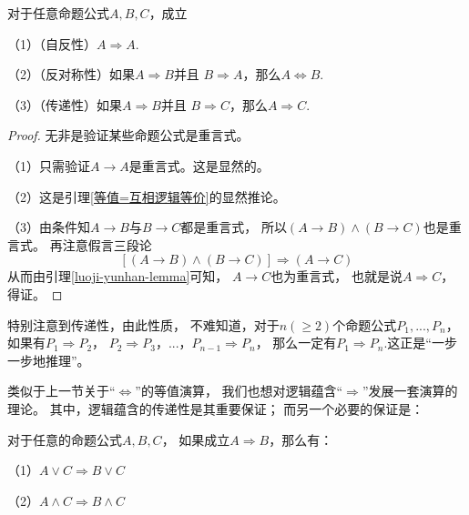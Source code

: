 \begin{thm}[逻辑蕴含是偏序关系]
对于任意命题公式$A,B,C$，成立

（1）（自反性）$A\Rightarrow A$.

（2）（反对称性）如果$A\Rightarrow B$并且
$B\Rightarrow A$，那么$A\Leftrightarrow B$.

（3）（传递性）如果$A\Rightarrow B$并且
$B\Rightarrow C$，那么$A\Rightarrow C$.
\label{logic imply-partial order}
\end{thm}

\begin{proof}无非是验证某些命题公式是重言式。

（1）只需验证$A\rightarrow A$是重言式。这是显然的。

（2）这是引理\ref{等值=互相逻辑等价}的显然推论。

（3）由条件知$A\rightarrow B$与$B\rightarrow C$都是重言式，
所以$(A\rightarrow B)\wedge(B\rightarrow C)$也是重言式。
再注意假言三段论
$$[(A\rightarrow B)\wedge(B\rightarrow C)]
\Rightarrow(A\rightarrow C)$$
从而由引理\ref{luoji-yunhan-lemma}可知，
$A\rightarrow C$也为重言式，
也就是说$A\Rightarrow C$，得证。
\end{proof}

特别注意到传递性，由此性质，
不难知道，对于$n(\geq 2)$个命题公式$P_1,...,P_n$，
如果有$P_1\Rightarrow P_2$，
$P_2\Rightarrow P_3$，...，$P_{n-1}\Rightarrow P_n$，
那么一定有$P_1\Rightarrow P_n$.这正是“一步一步地推理”。\vs

类似于上一节关于“$\Leftrightarrow$”的等值演算，
我们也想对逻辑蕴含“$\Rightarrow$”发展一套演算的理论。
其中，逻辑蕴含的传递性是其重要保证；
而另一个必要的保证是：

\begin{thm}[逻辑蕴含的置换规则]
\label{逻辑蕴含的置换规则}
对于任意的命题公式$A,B,C$，
如果成立$A\Rightarrow B$，那么有：

（1）$A\vee C\Rightarrow B\vee C$

（2）$A\wedge C\Rightarrow B\wedge C$
\end{thm}

